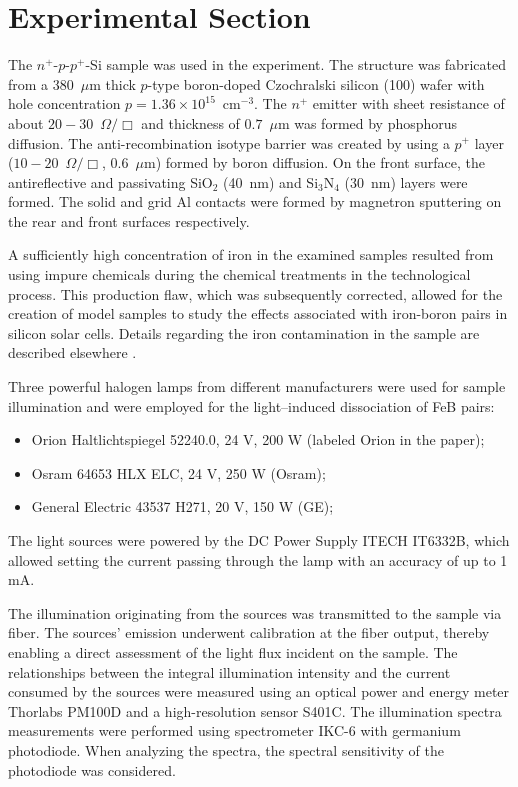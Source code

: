 \documentclass{WileyMSP-template}
\begin{document}

\section{Experimental Section}
\label{SecExp}

The $n^+$-$p$-$p^+$-Si sample was used in the experiment.
The structure was fabricated from a 380~$\mu$m thick $p$-type boron-doped
Czochralski silicon (100) wafer with hole concentration $p=1.36\times10^{15}$~cm$^{-3}$.
The $n^+$ emitter with sheet resistance of about $20-30$~$\Omega/\Box$
and  thickness of $0.7$~$\mu$m was formed by phosphorus diffusion.
The anti-recombination isotype barrier was created by using a $p^+$
layer ($10-20$~$\Omega/\Box$, $0.6$~$\mu$m) formed by boron diffusion.
On the front surface, the antireflective and passivating SiO$_2$ (40~nm) and Si$_3$N$_4$ (30~nm) layers
were formed.
The solid and grid Al contacts were formed by magnetron sputtering on the rear and front surfaces respectively.

A sufficiently high concentration of iron in the examined samples resulted from using impure chemicals during the chemical treatments in the technological process.
This production flaw, which was subsequently corrected, allowed for the creation of model samples to study the effects associated with iron-boron pairs in silicon solar cells.
Details regarding the iron contamination in the sample are described elsewhere \cite{Olikh2021JAP}.



Three powerful halogen lamps from different manufacturers were used for sample illumination and were employed for the light--induced dissociation of FeB pairs:
\begin{itemize}
  \item Orion Haltlichtspiegel 52240.0, 24 V, 200 W (labeled Orion in the paper);
  \item Osram 64653 HLX ELC, 24 V, 250 W (Osram);
  \item General Electric 43537 H271, 20 V, 150 W (GE);
\end{itemize}
The light sources were powered by the DC Power Supply ITECH IT6332B, which allowed setting the current passing through the lamp with an accuracy of up to 1 mA.

The illumination originating from the sources was transmitted to the sample via fiber.
The sources' emission underwent calibration at the fiber output,
thereby enabling a direct assessment of the light flux incident on the sample.
The relationships between the integral illumination intensity
and the current consumed by the sources were measured using an optical power and energy meter Thorlabs PM100D and a high-resolution sensor S401C.
The illumination spectra measurements were performed using spectrometer IKC-6 with germanium photodiode.
When analyzing the spectra, the spectral sensitivity of the photodiode was considered.
\end{document}
